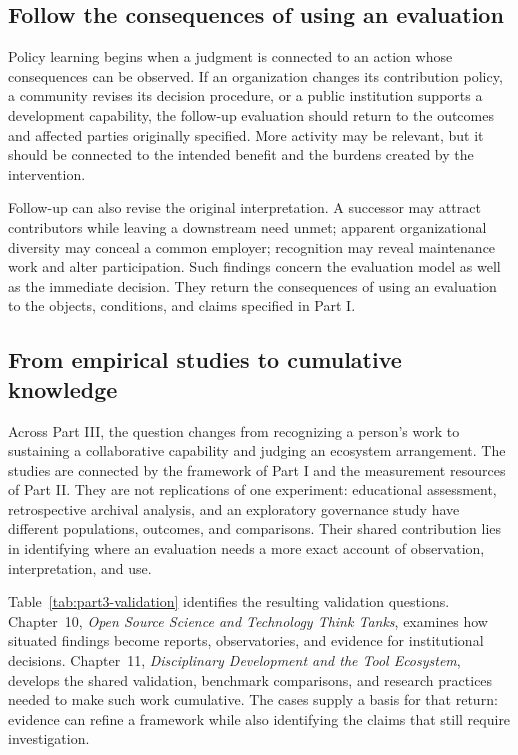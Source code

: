 \subsection{Follow the consequences of using an evaluation}
Policy learning begins when a judgment is connected to an action whose consequences can be observed. If an organization changes its contribution policy, a community revises its decision procedure, or a public institution supports a development capability, the follow-up evaluation should return to the outcomes and affected parties originally specified. More activity may be relevant, but it should be connected to the intended benefit and the burdens created by the intervention.

Follow-up can also revise the original interpretation. A successor may attract contributors while leaving a downstream need unmet; apparent organizational diversity may conceal a common employer; recognition may reveal maintenance work and alter participation. Such findings concern the evaluation model as well as the immediate decision. They return the consequences of using an evaluation to the objects, conditions, and claims specified in Part I.

\subsection{From empirical studies to cumulative knowledge}
Across Part III, the question changes from recognizing a person's work to sustaining a collaborative capability and judging an ecosystem arrangement. The studies are connected by the framework of Part I and the measurement resources of Part II. They are not replications of one experiment: educational assessment, retrospective archival analysis, and an exploratory governance study have different populations, outcomes, and comparisons. Their shared contribution lies in identifying where an evaluation needs a more exact account of observation, interpretation, and use.



Table~\ref{tab:part3-validation} identifies the resulting validation questions. Chapter~10, \emph{Open Source Science and Technology Think Tanks}, examines how situated findings become reports, observatories, and evidence for institutional decisions. Chapter~11, \emph{Disciplinary Development and the Tool Ecosystem}, develops the shared validation, benchmark comparisons, and research practices needed to make such work cumulative. The cases supply a basis for that return: evidence can refine a framework while also identifying the claims that still require investigation.
